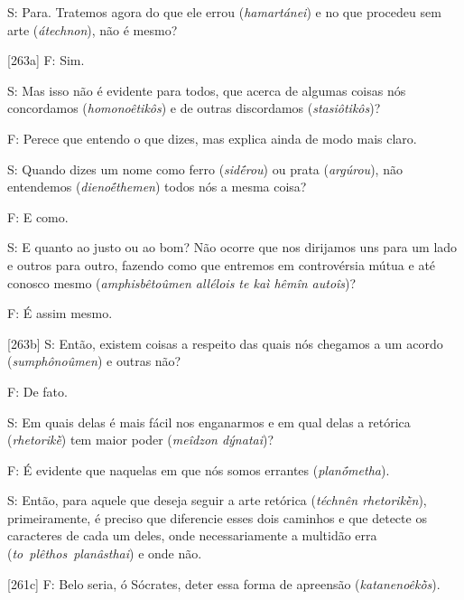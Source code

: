  

S: Para. Tratemos agora do que ele errou (\emph{hamartánei}) e no que
procedeu sem arte (\emph{átechnon}), não é mesmo?

 

[263a] F: Sim.

 

S: Mas isso não é evidente para todos, que acerca de algumas coisas nós
concordamos (\emph{homonoêtikôs}) e de outras discordamos
(\emph{stasiôtikôs})?

 

F: Perece que entendo o que dizes, mas explica ainda de modo mais claro.

 

S: Quando dizes um nome como ferro (\emph{sidḗrou}) ou prata
(\emph{argúrou}), não entendemos (\emph{dienoḗthemen}) todos nós a mesma
coisa?

 

F: E como.

 

S: E quanto ao justo ou ao bom? Não ocorre que nos dirijamos uns para um
lado e outros para outro, fazendo como que entremos em controvérsia
mútua e até conosco mesmo (\emph{amphisbêtoûmen allélois te kaì hêmîn
autoîs})?

 

F: É assim mesmo.

 

[263b] S: Então, existem coisas a respeito das quais nós chegamos a
um acordo (\emph{sumphônoûmen}) e outras não?

 

F: De fato.

 

S: Em quais delas é mais fácil nos enganarmos e em qual delas a retórica
(\emph{rhetorikḕ}) tem maior poder (\emph{meîdzon dýnatai})?

 

F: É evidente que naquelas em que nós somos errantes
(\emph{planṓmetha}).

 

S: Então, para aquele que deseja seguir a arte retórica (\emph{téchnên
rhetorikḕn}), primeiramente, é preciso que diferencie esses dois
caminhos e que detecte os caracteres de cada um deles, onde
necessariamente a multidão erra
(\emph{to}~\emph{plêthos}~\emph{planâsthai}) e onde não.

 

[261c] F: Belo seria, ó Sócrates, deter essa forma de apreensão
(\emph{katanenoêkṑs}).

